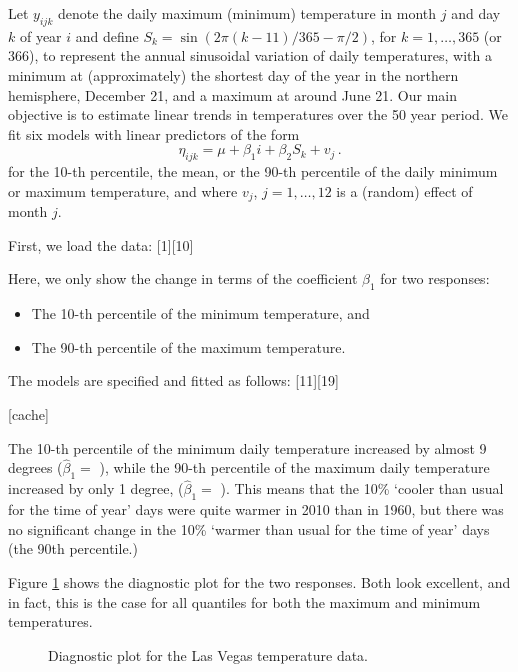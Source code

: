 \documentclass[a4paper,10pt]{article}
\begin{document}
Let $y_{ijk}$ denote the daily maximum (minimum) temperature in month $j$ and day $k$ of year $i$ and define $S_k=\sin(2\pi(k-11)/365-\pi/2)$, for $k=1,\ldots,365$ (or $366$), to represent the annual sinusoidal variation of daily temperatures, with a minimum at (approximately) the  shortest day of the year in the northern hemisphere,  December 21, and a maximum at around June 21. Our main objective is to estimate linear trends in temperatures over the 50 year period. We fit six models with linear predictors of the form 
$$ \eta_{ijk}=\mu+\beta_1i+\beta_2S_k + v_j \,.$$
for the 10-th percentile, the mean, or the 90-th percentile of the daily minimum or maximum temperature, and where $v_j$, $j=1,\ldots,12$ is a (random) effect of month $j$. 

First, we load the data:
[1][10]

Here, we only show the change in terms of the coefficient  $\beta_1$  for  two responses:
\begin{itemize}
\item The 10-th percentile of the minimum temperature, and
\item The 90-th percentile of the maximum temperature.
\end{itemize}
The models are specified and fitted as follows:
[11][19]

[cache]

The 10-th percentile of the minimum daily temperature  increased by almost 9 degrees ($\hat\beta_1=$ ), while  the 90-th percentile of the maximum daily temperature increased by only 1 degree, ($\hat\beta_1=$ ).
This means that the 10\% `cooler than usual for the time of year' days were quite warmer in 2010 than in 1960, but there was no significant change in the 10\% `warmer than usual for the time of year' days (the 90th percentile.)

Figure \ref{temps} shows the diagnostic plot for the two responses. Both look excellent, and in fact, this is the case for all quantiles for both the maximum and minimum temperatures.

\begin{figure}[t!]
\centering
{}
\caption{Diagnostic plot for the Las Vegas temperature data.}\label{temps}
\end{figure}
\end{document}
